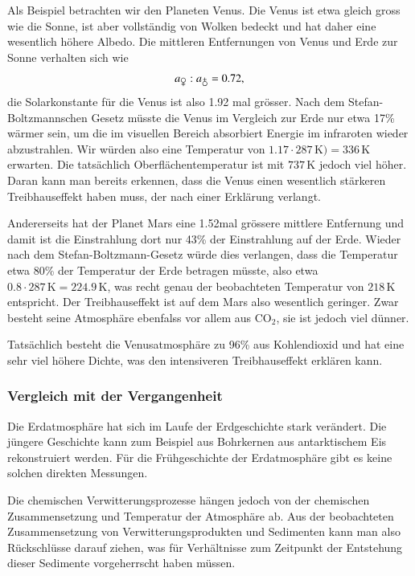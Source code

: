 Als Beispiel betrachten wir den Planeten Venus.
Die Venus ist etwa gleich gross wie die Sonne, ist aber vollständig
von Wolken bedeckt und hat daher eine wesentlich höhere Albedo.
Die mittleren Entfernungen von Venus und Erde zur Sonne verhalten
sich wie
\[
a_{\venus}
:
a_{\earth}
=
0.72,
\]
die Solarkonstante für die Venus ist also 1.92 mal grösser.
Nach dem Stefan-Boltzmannschen Gesetz müsste die Venus im Vergleich
zur Erde nur etwa 17\% wärmer sein, um die im visuellen Bereich
absorbiert Energie im infraroten wieder abzustrahlen.
Wir würden also eine Temperatur von $1.17\cdot 287\,\text{K})=336\,\text{K}$
erwarten.
Die tatsächlich Oberflächentemperatur ist mit $737\,\text{K}$ jedoch viel
höher.
Daran kann man bereits erkennen, dass die Venus einen wesentlich
stärkeren Treibhauseffekt haben muss, der nach einer Erklärung
verlangt.

Andererseits hat der Planet Mars eine 1.52mal grössere mittlere
Entfernung und damit ist die Einstrahlung dort nur 43\% der
Einstrahlung auf der Erde.
Wieder nach dem Stefan-Boltzmann-Gesetz würde dies verlangen, dass die
Temperatur etwa 80\% der Temperatur der Erde betragen müsste,
also etwa $0.8\cdot 287\,\text{K} = 224.9\,\text{K}$, was recht genau
der beobachteten Temperatur von $218\,\text{K}$ entspricht.
Der Treibhauseffekt ist auf dem Mars also wesentlich geringer.
Zwar besteht seine Atmosphäre ebenfalss vor allem aus $\text{CO}_2$,
sie ist jedoch viel dünner.

Tatsächlich besteht die Venusatmosphäre zu 96\% aus Kohlendioxid und
hat eine sehr viel höhere Dichte, was den intensiveren Treibhauseffekt
erklären kann.

\subsubsection{Vergleich mit der Vergangenheit}
Die Erdatmosphäre hat sich im Laufe der Erdgeschichte stark verändert.
Die jüngere Geschichte kann zum Beispiel aus Bohrkernen aus antarktischem
Eis rekonstruiert werden.
Für die Frühgeschichte der Erdatmosphäre gibt es keine solchen direkten
Messungen.

Die chemischen Verwitterungsprozesse hängen jedoch von der chemischen
Zusammensetzung und Temperatur der Atmosphäre ab.
Aus der beobachteten Zusammensetzung von Verwitterungsprodukten und
Sedimenten kann man also Rückschlüsse darauf ziehen, was für Verhältnisse
zum Zeitpunkt der Entstehung dieser Sedimente vorgeherrscht haben müssen.

